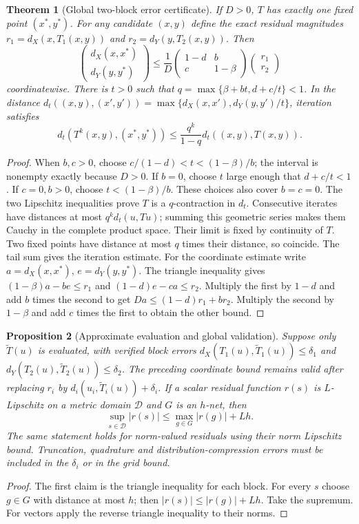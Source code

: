 \documentclass[11pt]{article}
\newtheorem{theorem}{Theorem}
\newtheorem{proposition}[theorem]{Proposition}
\theoremstyle{remark}
\begin{document}
\begin{theorem}[Global two-block error certificate]
If $D>0$, $T$ has exactly one fixed point $(x^*,y^*)$. For any candidate
$(x,y)$ define the exact residual magnitudes
$r_1=d_X(x,T_1(x,y))$ and $r_2=d_Y(y,T_2(x,y))$. Then
\[
 \begin{pmatrix}d_X(x,x^*)\\d_Y(y,y^*)\end{pmatrix}
 \leq\frac1D
 \begin{pmatrix}1-d&b\\c&1-\beta\end{pmatrix}
 \begin{pmatrix}r_1\\r_2\end{pmatrix}
\]
coordinatewise. There is $t>0$ such that
$q=\max\{\beta+bt,d+c/t\}<1$. In the distance
$d_t((x,y),(x',y'))=\max\{d_X(x,x'),d_Y(y,y')/t\}$,
iteration satisfies
\[
 d_t(T^k(x,y),(x^*,y^*))\leq
 \frac{q^k}{1-q}d_t((x,y),T(x,y)).
\]
\end{theorem}
\begin{proof}
When $b,c>0$, choose $c/(1-d)<t<(1-\beta)/b$; the interval is
nonempty exactly because $D>0$. If $b=0$, choose $t$ large enough that
$d+c/t<1$. If $c=0,b>0$, choose $t<(1-\beta)/b$. These choices also
cover $b=c=0$. The two Lipschitz inequalities prove $T$ is a
$q$-contraction in $d_t$. Consecutive iterates have distances at most
$q^k d_t(u,Tu)$; summing this geometric series makes them Cauchy in the
complete product space. Their limit is fixed by continuity of $T$.
Two fixed points have distance at most $q$ times their distance, so coincide.
The tail sum gives the iteration estimate.
For the coordinate estimate write $a=d_X(x,x^*)$, $e=d_Y(y,y^*)$.
The triangle inequality gives $(1-\beta)a-be\leq r_1$ and
$(1-d)e-ca\leq r_2$. Multiply the first by $1-d$ and add $b$ times
the second to get $Da\leq(1-d)r_1+br_2$. Multiply the second by
$1-\beta$ and add $c$ times the first to obtain the other bound.
\end{proof}

\begin{proposition}[Approximate evaluation and global validation]
Suppose only $\widetilde T(u)$ is evaluated, with verified block errors
$d_X(T_1(u),\widetilde T_1(u))\leq\delta_1$ and
$d_Y(T_2(u),\widetilde T_2(u))\leq\delta_2$. The preceding coordinate
bound remains valid after replacing $r_i$ by
$d_i(u_i,\widetilde T_i(u))+\delta_i$.
If a scalar residual function $r(s)$ is $L$-Lipschitz on a metric domain
$\mathcal D$ and $G$ is an $h$-net, then
\[
 \sup_{s\in\mathcal D}|r(s)|\leq\max_{g\in G}|r(g)|+Lh.
\]
The same statement holds for norm-valued residuals using their norm
Lipschitz bound. Truncation, quadrature and distribution-compression errors
must be included in the $\delta_i$ or in the grid bound.
\end{proposition}
\begin{proof}
The first claim is the triangle inequality for each block. For every $s$
choose $g\in G$ with distance at most $h$; then
$|r(s)|\leq |r(g)|+Lh$. Take the supremum. For vectors apply the reverse
triangle inequality to their norms.
\end{proof}
\end{document}
